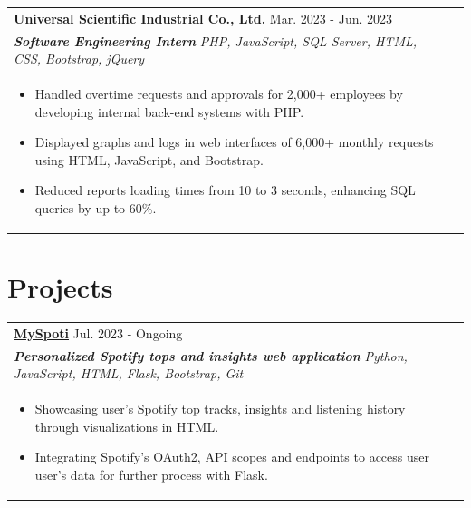 \documentclass{article}
\begin{document}
\begin{tabularx}{\linewidth}{ @{}l r@{} }
\color[HTML]{1C033C} \textbf{Universal Scientific Industrial Co., Ltd.} \hfill \color[HTML]{371e77} Mar. 2023 - Jun. 2023 \\[4pt]
\color[HTML]{371e77}\textbf{\textit{Software Engineering Intern}} \hfill \color[HTML]{4B28A4} \textit{PHP, JavaScript, SQL Server, HTML, CSS, Bootstrap, jQuery} \\[5pt]
\begin{minipage}[t]{\linewidth}
    \begin{itemize}[nosep,after=\strut, leftmargin=2em, itemsep=2pt]
        \item Handled overtime requests and approvals for 2,000+ employees by developing internal back-end systems with PHP.
        \item Displayed graphs and logs in web interfaces of 6,000+ monthly requests using HTML, JavaScript, and Bootstrap.
        \item Reduced reports loading times from 10 to 3 seconds, enhancing SQL queries by up to 60\%.
    \end{itemize}
    \end{minipage}
\end{tabularx}

\section{Projects}
\begin{tabularx}{\linewidth}{ @{}l r@{} }
\color[HTML]{1C033C} \textbf{\uline{\href{https://github.com/}{MySpoti}}} \hfill \color[HTML]{371e77} Jul. 2023 - Ongoing \\[4pt]
\color[HTML]{371e77}\textbf{\textit{Personalized Spotify tops and insights web application }} \hfill \color[HTML]{4B28A4} \textit{Python, JavaScript, HTML, Flask, Bootstrap, Git} \\[5pt]
\begin{minipage}[t]{\linewidth}
    \begin{itemize}[nosep,after=\strut, leftmargin=2em, itemsep=2pt]
        \item Showcasing user's Spotify top tracks, insights and listening history through visualizations in HTML.
        \item Integrating Spotify's OAuth2, API scopes and endpoints to access user user's data for further process with Flask.
    \end{itemize}
    \end{minipage}
\end{tabularx}
\end{document}
